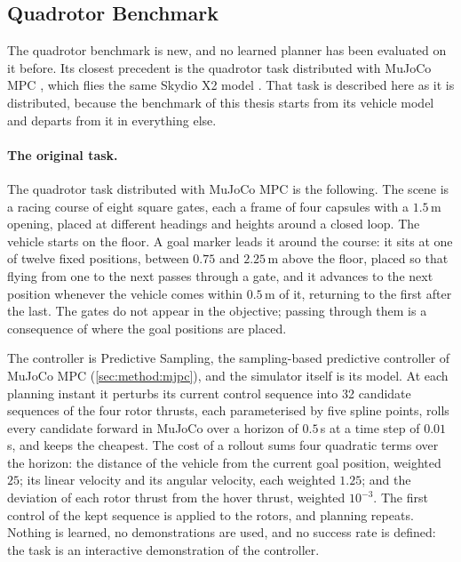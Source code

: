 \subsection{Quadrotor Benchmark}\label{sec:setup:baselines:uav}

The quadrotor benchmark is new, and no learned planner has been evaluated on it before. Its closest
precedent is the quadrotor task distributed with MuJoCo MPC \parencite{howell2022predictive}, which flies
the same Skydio X2 model \parencite{zakka2022menagerie}. That task is described here as it is
distributed, because the benchmark of this thesis starts from its vehicle model and departs from it in
everything else.

\paragraph{The original task.} The quadrotor task distributed with MuJoCo MPC
\parencite{howell2022predictive} is the following. The scene is a racing course of eight square gates, each a frame of four
capsules with a $1.5$\,m opening, placed at different headings and heights around a closed loop. The
vehicle starts on the floor. A goal marker leads it around the course: it sits at one of twelve fixed
positions, between $0.75$ and $2.25$\,m above the floor, placed so that flying from one to the next passes
through a gate, and it advances to the next position whenever the vehicle comes within $0.5$\,m of it,
returning to the first after the last. The gates do not appear in the objective; passing through them is
a consequence of where the goal positions are placed.

The controller is Predictive Sampling, the sampling-based predictive controller of MuJoCo MPC
(\autoref{sec:method:mjpc}), and the simulator itself is its model. At each planning instant it perturbs its current control sequence into 32
candidate sequences of the four rotor thrusts, each parameterised by five spline points, rolls every
candidate forward in MuJoCo over a horizon of $0.5$\,s at a time step of $0.01$\,s, and keeps the
cheapest. The cost of a rollout sums four quadratic terms over the horizon: the distance of the vehicle
from the current goal position, weighted $25$; its linear velocity and its angular velocity, each
weighted $1.25$; and the deviation of each rotor thrust from the hover thrust, weighted $10^{-3}$. The
first control of the kept sequence is applied to the rotors, and planning repeats. Nothing is learned,
no demonstrations are used, and no success rate is defined: the task is an interactive demonstration of
the controller.


